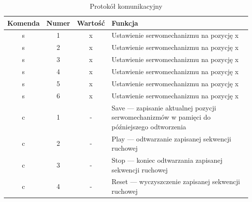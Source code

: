 \documentclass[11pt,titlepage]{article}
\begin{document}
\vspace{\fill}

\begin{table}[h!]
    \begin{center}
        \begin{tabular}{|c|c|c|m{10cm}|}
            \hline
            Komenda & Numer & Wartość & Funkcja                                                                                   \\
            \hline
            s       & 1     & x       & Ustawienie serwomechanizmu na pozycję x                                                   \\
            \hline
            s       & 2     & x       & Ustawienie serwomechanizmu na pozycję x                                                   \\
            \hline
            s       & 3     & x       & Ustawienie serwomechanizmu na pozycję x                                                   \\
            \hline
            s       & 4     & x       & Ustawienie serwomechanizmu na pozycję x                                                   \\
            \hline
            s       & 5     & x       & Ustawienie serwomechanizmu na pozycję x                                                   \\
            \hline
            s       & 6     & x       & Ustawienie serwomechanizmu na pozycję x                                                   \\
            \hline
            c       & 1     & -       & Save — zapisanie aktualnej pozycji serwomechanizmów w pamięci do późniejszego odtworzenia \\
            \hline
            c       & 2     & -       & Play — odtwarzanie zapisanej sekwencji ruchowej                                           \\
            \hline
            c       & 3     & -       & Stop — koniec odtwarzania zapisanej sekwencji ruchowej                                    \\
            \hline
            c       & 4     & -       & Reset — wyczyszczenie zapisanej sekwencji ruchowej                                        \\
            \hline
        \end{tabular}
    \end{center}
    \caption{Protokół komunikacyjny}
    \label{Komunikacja}
\end{table}
\end{document}
